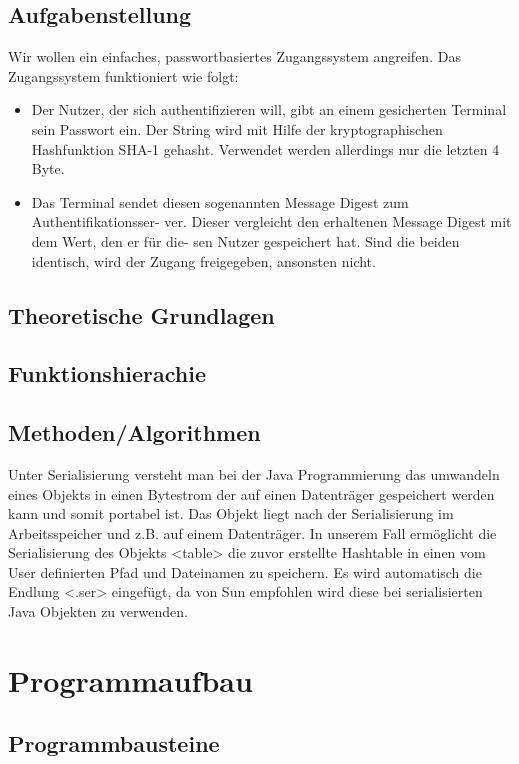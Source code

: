 \documentclass[11pt]{article}
\begin{document}
  \subsection{Aufgabenstellung}
  Wir wollen ein einfaches, passwortbasiertes Zugangssystem angreifen. Das Zugangssystem
funktioniert wie folgt:
\begin{itemize} 
\item Der Nutzer, der sich authentifizieren will, gibt an einem gesicherten Terminal sein
Passwort ein. Der String wird mit Hilfe der kryptographischen Hashfunktion SHA-1
gehasht. Verwendet werden allerdings nur die letzten 4 Byte.
\item Das Terminal sendet diesen sogenannten Message Digest zum Authentifikationsser-
ver. Dieser vergleicht den erhaltenen Message Digest mit dem Wert, den er für die-
sen Nutzer gespeichert hat. Sind die beiden identisch, wird der Zugang freigegeben,
ansonsten nicht.
\end{itemize}
  \subsection{Theoretische Grundlagen}
  \subsection{Funktionshierachie}
  \subsection{Methoden/Algorithmen}
Unter Serialisierung versteht man bei der Java Programmierung das umwandeln eines Objekts in einen Bytestrom der auf einen Datenträger gespeichert werden kann und somit portabel ist. Das Objekt liegt nach der Serialisierung im Arbeitsspeicher und z.B. auf einem Datenträger.
In unserem Fall ermöglicht die Serialisierung des Objekts <table> die zuvor erstellte Hashtable in einen vom User definierten Pfad und Dateinamen zu speichern. Es wird automatisch die Endlung <.ser> eingefügt, da von Sun empfohlen wird diese bei serialisierten Java Objekten zu verwenden.
 
  
  
  \section{Programmaufbau}
  \subsection{Programmbausteine}
\end{document}
